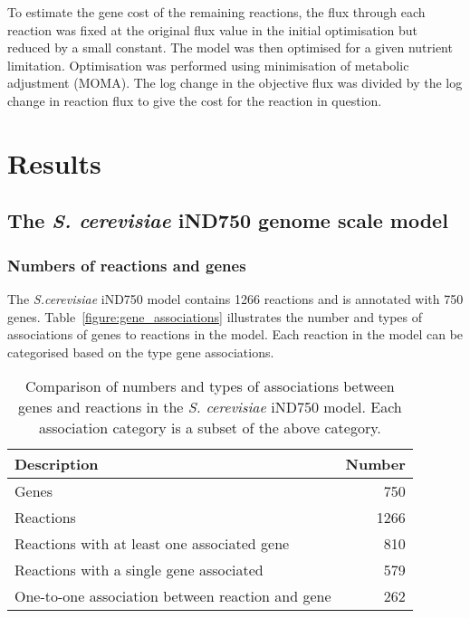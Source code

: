 To estimate the gene cost of the remaining reactions, the flux through each reaction was fixed at the original flux value in the initial optimisation but reduced by a small constant. The model was then optimised for a given nutrient limitation. Optimisation was performed using minimisation of metabolic adjustment (MOMA). The log change in the objective flux was divided by the log change in reaction flux to give the cost for the reaction in question.



\clearpage

\section{Results}

\subsection{The \emph{S. cerevisiae} iND750 genome scale model}

\subsubsection{Numbers of reactions and genes}

The \emph{S.cerevisiae} iND750 model contains 1266 reactions and is annotated with 750 genes. Table~\vref{figure:gene_associations} illustrates the number and types of associations of genes to reactions in the model. Each reaction in the model can be categorised based on the type gene associations.

\begin{table}
  \centering
  \begin{tabular}{l r}
                                                                   \toprule
    Description                                      & Number   \\ \midrule
    Genes                                            & 750      \\
    Reactions                                        & 1266     \\
    Reactions with at least one associated gene      & 810      \\
    Reactions with a single gene associated          & 579      \\
    One-to-one association between reaction and gene & 262      \\ \bottomrule
  \end{tabular}
  \caption[Gene associations in the \emph{S. cerevisiae} iND750 model]{Comparison of numbers and types of associations between genes and reactions in the \emph{S. cerevisiae} iND750 model. Each association category is a subset of the above category.}
  \label{figure:gene_associations}
\end{table}

